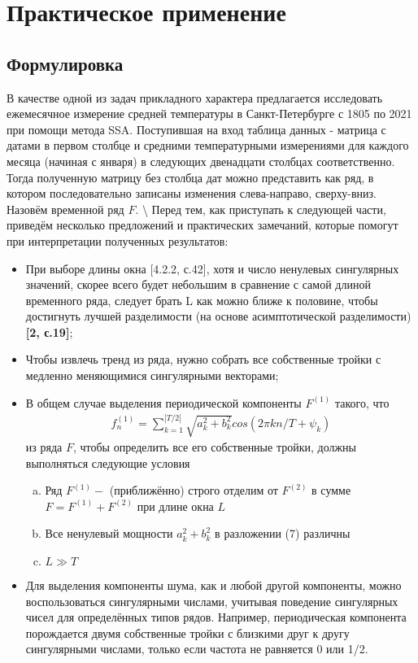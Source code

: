 \documentclass[
]{article}
\begin{document}
\section{Практическое применение}
\subsection{Формулировка}

В качестве одной из задач прикладного характера предлагается исследовать
ежемесячное измерение средней температуры в Санкт-Петербурге с 1805 по
2021 при помощи метода SSA. Поступившая на вход таблица данных - матрица
с датами в первом столбце и средними температурными измерениями для
каждого месяца (начиная с января) в следующих двенадцати столбцах
соответственно. Тогда полученную матрицу без столбца дат можно
представить как ряд, в котором последовательно записаны изменения
слева-направо, сверху-вниз. Назовём временной ряд \(F\).
\textbackslash{} Перед тем, как приступать к следующей части, приведём
несколько предложений и практических замечаний, которые помогут при
интерпретации полученных результатов:

\begin{itemize}
    \item При выборе длины окна [4.2.2, с.42], хотя и число ненулевых сингулярных значений, скорее всего будет небольшим в сравнение с самой длиной временного ряда, следует брать L как можно ближе к половине, чтобы достигнуть лучшей разделимости (на основе асимптотической разделимости) \textbf{[2, с.19]};
    \item Чтобы извлечь тренд из ряда, нужно собрать все собственные тройки с медленно меняющимися сингулярными векторами;
    \item В общем случае выделения периодической компоненты $F^{(1)}$ такого, что
    \begin{align}
        f_n^{(1)} = \sum\limits^{|T/2|}_{k=1}\sqrt{a^2_k + b^2_k}cos(2\pi k n /T + \psi_k)
    \end{align}
    из ряда $F$, чтобы определить все его собственные тройки, должны выполняться следующие условия
    \begin{enumerate}[(a)]
        \item Ряд $F^{(1)} -$ (приближённо) строго отделим от $F^{(2)}$ в сумме $F = F^{(1)} + F^{(2)}$ при длине окна $L$ 
        \item Все ненулевый мощности $a^2_k+b^2_k$ в разложении (7) различны
        \item $L \gg T$ 
    \end{enumerate}
\newpage
    \item Для выделения компоненты шума, как и любой другой компоненты, можно воспользоваться сингулярными числами, учитывая поведение сингулярных чисел для определённых типов рядов. Например, периодическая компонента порождается двумя собственные тройки с близкими друг к другу сингулярными числами, только если частота не равняется 0 или 1/2.
\end{itemize}
\end{document}
